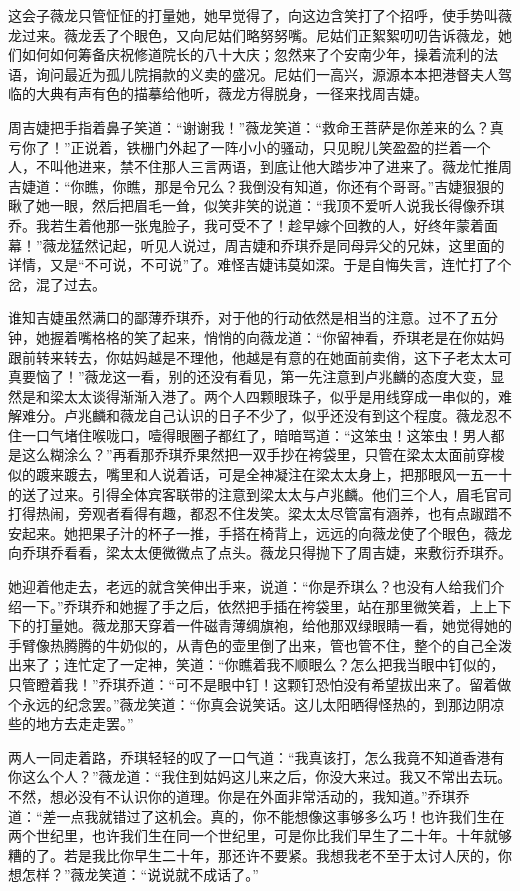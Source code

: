 \par 这会子薇龙只管怔怔的打量她，她早觉得了，向这边含笑打了个招呼，使手势叫薇龙过来。薇龙丢了个眼色，又向尼姑们略努努嘴。尼姑们正絮絮叨叨告诉薇龙，她们如何如何筹备庆祝修道院长的八十大庆；忽然来了个安南少年，操着流利的法语，询问最近为孤儿院捐款的义卖的盛况。尼姑们一高兴，源源本本把港督夫人驾临的大典有声有色的描摹给他听，薇龙方得脱身，一径来找周吉婕。
\par 周吉婕把手指着鼻子笑道：“谢谢我！”薇龙笑道：“救命王菩萨是你差来的么？真亏你了！”正说着，铁栅门外起了一阵小小的骚动，只见睨儿笑盈盈的拦着一个人，不叫他进来，禁不住那人三言两语，到底让他大踏步冲了进来了。薇龙忙推周吉婕道：“你瞧，你瞧，那是令兄么？我倒没有知道，你还有个哥哥。”吉婕狠狠的瞅了她一眼，然后把眉毛一耸，似笑非笑的说道：“我顶不爱听人说我长得像乔琪乔。我若生着他那一张鬼脸子，我可受不了！趁早嫁个回教的人，好终年蒙着面幕！”薇龙猛然记起，听见人说过，周吉婕和乔琪乔是同母异父的兄妹，这里面的详情，又是“不可说，不可说”了。难怪吉婕讳莫如深。于是自悔失言，连忙打了个岔，混了过去。
\par 谁知吉婕虽然满口的鄙薄乔琪乔，对于他的行动依然是相当的注意。过不了五分钟，她握着嘴格格的笑了起来，悄悄的向薇龙道：“你留神看，乔琪老是在你姑妈跟前转来转去，你姑妈越是不理他，他越是有意的在她面前卖俏，这下子老太太可真要恼了！”薇龙这一看，别的还没有看见，第一先注意到卢兆麟的态度大变，显然是和梁太太谈得渐渐入港了。两个人四颗眼珠子，似乎是用线穿成一串似的，难解难分。卢兆麟和薇龙自己认识的日子不少了，似乎还没有到这个程度。薇龙忍不住一口气堵住喉咙口，噎得眼圈子都红了，暗暗骂道：“这笨虫！这笨虫！男人都是这么糊涂么？”再看那乔琪乔果然把一双手抄在袴袋里，只管在梁太太面前穿梭似的踱来踱去，嘴里和人说着话，可是全神凝注在梁太太身上，把那眼风一五一十的送了过来。引得全体宾客联带的注意到梁太太与卢兆麟。他们三个人，眉毛官司打得热闹，旁观者看得有趣，都忍不住发笑。梁太太尽管富有涵养，也有点踧踖不安起来。她把果子汁的杯子一推，手搭在椅背上，远远的向薇龙使了个眼色，薇龙向乔琪乔看看，梁太太便微微点了点头。薇龙只得抛下了周吉婕，来敷衍乔琪乔。
\par 她迎着他走去，老远的就含笑伸出手来，说道：“你是乔琪么？也没有人给我们介绍一下。”乔琪乔和她握了手之后，依然把手插在袴袋里，站在那里微笑着，上上下下的打量她。薇龙那天穿着一件磁青薄绸旗袍，给他那双绿眼睛一看，她觉得她的手臂像热腾腾的牛奶似的，从青色的壶里倒了出来，管也管不住，整个的自己全泼出来了；连忙定了一定神，笑道：“你瞧着我不顺眼么？怎么把我当眼中钉似的，只管瞪着我！”乔琪乔道：“可不是眼中钉！这颗钉恐怕没有希望拔出来了。留着做个永远的纪念罢。”薇龙笑道：“你真会说笑话。这儿太阳晒得怪热的，到那边阴凉些的地方去走走罢。”
\par 两人一同走着路，乔琪轻轻的叹了一口气道：“我真该打，怎么我竟不知道香港有你这么个人？”薇龙道：“我住到姑妈这儿来之后，你没大来过。我又不常出去玩。不然，想必没有不认识你的道理。你是在外面非常活动的，我知道。”乔琪乔道：“差一点我就错过了这机会。真的，你不能想像这事够多么巧！也许我们生在两个世纪里，也许我们生在同一个世纪里，可是你比我们早生了二十年。十年就够糟的了。若是我比你早生二十年，那还许不要紧。我想我老不至于太讨人厌的，你想怎样？”薇龙笑道：“说说就不成话了。”
